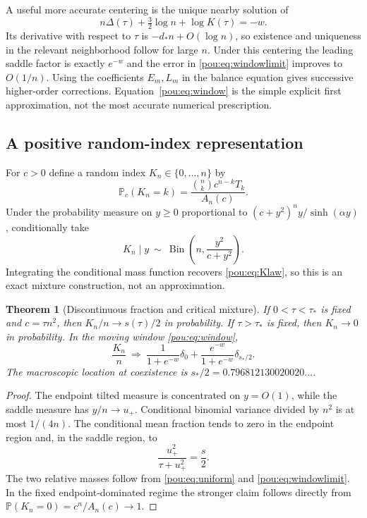 \documentclass[11pt]{article}
\newtheorem{theorem}{Theorem}[section]
\theoremstyle{definition}
\theoremstyle{remark}
\newcommand{\Prob}{\mathbb P}
\begin{document}
A useful more accurate centering is the unique nearby solution of
\begin{equation}\label{pou:eq:exactbalance}
 n\Delta(\tau)+\tfrac32\log n+\log K(\tau)=-w.
\end{equation}
Its derivative with respect to $\tau$ is $-d_*n+O(\log n)$, so existence
and uniqueness in the relevant neighborhood follow for large $n$.
Under this centering the leading saddle factor is exactly $e^{-w}$ and
the error in \eqref{pou:eq:windowlimit} improves to $O(1/n)$.
Using the coefficients $E_m,L_m$ in the balance equation gives successive
higher-order corrections.  Equation~\eqref{pou:eq:window} is the simple explicit
first approximation, not the most accurate numerical prescription.

\subsection{A positive random-index representation}

For $c>0$ define a random index $K_n\in\{0,\ldots,n\}$ by
\begin{equation}\label{pou:eq:Klaw}
 \Prob_c(K_n=k)=\frac{\binom nk c^{n-k}T_k}{A_n(c)}.
\end{equation}
Under the probability measure on $y\ge0$ proportional to
$(c+y^2)^n y/\sinh(\alpha y)$, conditionally take
\begin{equation}\label{pou:eq:conditionalbinomial}
 K_n\mid y\ \sim\ \operatorname{Bin}
 \left(n,\frac{y^2}{c+y^2}\right).
\end{equation}
Integrating the conditional mass function recovers \eqref{pou:eq:Klaw}, so
this is an exact mixture construction, not an approximation.

\begin{theorem}[Discontinuous fraction and critical mixture]
\label{pou:thm:mixture}
If $0<\tau<\tau_*$ is fixed and $c=\tau n^2$, then
$K_n/n\to s(\tau)/2$ in probability.
If $\tau>\tau_*$ is fixed, then $K_n\to0$ in probability.
In the moving window \eqref{pou:eq:window},
\begin{equation}\label{pou:eq:twopoint}
 \frac{K_n}{n}\ \Longrightarrow\
 \frac1{1+e^{-w}}\delta_0+
 \frac{e^{-w}}{1+e^{-w}}\delta_{s_*/2}.
\end{equation}
The macroscopic location at coexistence is
$s_*/2=0.796812130020020\ldots$.
\end{theorem}
\begin{proof}
The endpoint tilted measure is concentrated on $y=O(1)$, while the saddle
measure has $y/n\to u_+$.  Conditional binomial variance divided by $n^2$
is at most $1/(4n)$.
The conditional mean fraction tends to zero in the endpoint region and,
in the saddle region, to
\[
 \frac{u_+^2}{\tau+u_+^2}=\frac s2.
\]
The two relative masses follow from \eqref{pou:eq:uniform} and
\eqref{pou:eq:windowlimit}.  In the fixed endpoint-dominated regime the stronger
claim follows directly from
$\Prob(K_n=0)=c^n/A_n(c)\to1$.
\end{proof}
\end{document}

